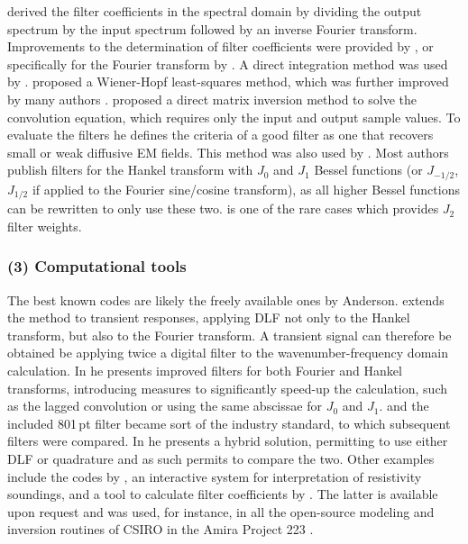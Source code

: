 \documentclass[paper,twocolumn,twoside]{geophysics}
\begin{document}
\cite{PhD.70.Ghosh} derived the filter coefficients in the spectral domain by
dividing the output spectrum by the input spectrum followed by an inverse
Fourier transform. Improvements to the determination of filter coefficients
were provided by \cite{EXG.75.ONeill, GEO.77.Nyman, GEO.82.Das}, or
specifically for the Fourier transform by \cite{GP.86.Nissen}. A direct
integration method was used by \cite{GP.76.Bichara, GP.78.Bernabini}.
\cite{GP.79.Koefoed} proposed a Wiener-Hopf least-squares method, which was
further improved by many authors \citep{GP.82.Guptasarma, GEO.1982.Murakami,
GP.97.Guptasarma}. \cite{GP.07.Kong} proposed a direct matrix inversion method
to solve the convolution equation, which requires only the input and output
sample values. To evaluate the filters he defines the criteria of a good filter
as one that recovers small or weak diffusive EM fields. This method was also
used by \cite{GEO.09.Key, GEO.12.Key}. Most authors publish filters for the
Hankel transform with $J_0$ and $J_1$ Bessel functions (or $J_{-1/2}$,
$J_{1/2}$ if applied to the Fourier sine/cosine transform), as all higher
Bessel functions can be rewritten to only use these two. \cite{GP.94.Mohsen} is
one of the rare cases which provides $J_2$ filter weights.

\subsubsection{(3) Computational tools}

The best known codes are likely the freely available ones by Anderson.
\cite{USGS.73.Anderson} extends the method to transient responses, applying DLF
not only to the Hankel transform, but also to the Fourier transform. A
transient signal can therefore be obtained be applying twice a digital filter
to the wavenumber-frequency domain calculation. In \cite{USGS.75.Anderson,
GEO.79.Anderson} he presents improved filters for both Fourier and Hankel
transforms, introducing measures to significantly speed-up the calculation,
such as the lagged convolution or using the same abscissae for $J_0$ and $J_1$.
\cite{TMS.82.Anderson} and the included 801\,pt filter became sort of the
industry standard, to which subsequent filters were compared. In
\cite{GEO.89.Anderson} he presents a hybrid solution, permitting to use either
DLF or quadrature and as such permits to compare the two. Other examples
include the codes by \cite{GP.75.Johansen}, an interactive system for
interpretation of resistivity soundings, and a tool to calculate filter
coefficients by \cite{GP.90.Christensen}. The latter is available upon request
and was used, for instance, in all the open-source modeling and inversion
routines of CSIRO in the Amira Project 223 \citep{ASEG.07.Raiche}. \newline
\end{document}
